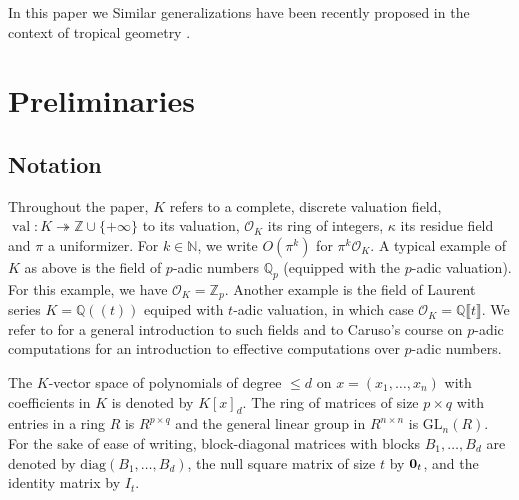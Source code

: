 \documentclass[a4paper,oneside,11pt]{article}
\newcommand{\N}{\mathbb{N}} %
\DeclareMathOperator{\val}{val}
\def\QQ{\ensuremath{\mathbb{Q}}}
\def\ZZ{\ensuremath{\mathbb{Z}}}
\newcommand{\OK}{\mathcal{O}_K}
\def\diag{\mathrm{diag}}
\newcommand{\GL}{\mathrm{GL}}
\begin{document}
In this paper we 
Similar generalizations have been recently proposed in the context of tropical geometry \cite{iriarte2022polyhedral}.



\section{Preliminaries}





\subsection{Notation}

Throughout the paper, $K$ refers to a complete,
discrete valuation field, $\val : K \twoheadrightarrow \ZZ \cup \{+\infty\}$ to its valuation,
$\OK$ its ring of integers, $\kappa$ its residue field and $\pi$ a uniformizer.
For $k \in \N$, we write $O(\pi^k)$ for $\pi^k \OK$.
A typical example of $K$ as above is the field of $p$-adic numbers 
$\QQ_p$ (equipped with the $p$-adic valuation). For this example, we 
have $\OK = \ZZ_p$.
Another example is the field of Laurent series
$K=\QQ(\!(t)\!)$ equiped with $t$-adic valuation,
in which case $\OK = \QQ \llbracket t \rrbracket$.
We refer to \cite{Serre:1979} for a
general introduction to such fields
and to Caruso's course on $p$-adic computations \cite{caruso_computations_2017}
for an introduction to effective computations over $p$-adic numbers.

The $K$-vector space of polynomials of degree $\leq d$ on $x=(x_1,\ldots,x_n)$
with coefficients in $K$ is denoted by $K[x]_{d}$. The ring of matrices of
size $p \times q$ with entries in a ring $R$ is $R^{p \times q}$ and the general
linear group in $R^{n \times n}$ is $\GL_n(R)$.
For the sake of ease of writing, block-diagonal matrices with blocks
$B_1,\ldots,B_d$ are denoted by $\diag(B_1, \ldots, B_d)$, the null square
matrix of size $t$ by ${\bf 0}_{t}$, and the identity matrix by $I_t$.
\end{document}
